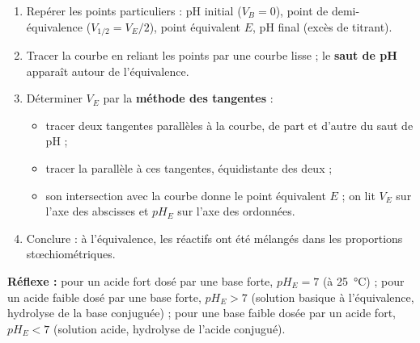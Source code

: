 \documentclass[11pt]{article}
\newcommand{\cle}[1]{{\popxbold\color{popdark}#1}}
\begin{document}
\begin{methode}[Tracer et exploiter la courbe pH = f(V)]
\begin{enumerate}
\item \cle{Repérer} les points particuliers : pH initial ($V_B = 0$), point de demi-équivalence ($V_{1/2} = V_E/2$), point équivalent $E$, pH final (excès de titrant).
\item \cle{Tracer} la courbe en reliant les points par une courbe lisse ; le \textbf{saut de pH} apparaît autour de l'équivalence.
\item \cle{Déterminer} $V_E$ par la \textbf{méthode des tangentes} :
\begin{itemize}
\item tracer deux tangentes parallèles à la courbe, de part et d'autre du saut de pH ;
\item tracer la parallèle à ces tangentes, équidistante des deux ;
\item son intersection avec la courbe donne le point équivalent $E$ ; on lit $V_E$ sur l'axe des abscisses et $pH_E$ sur l'axe des ordonnées.
\end{itemize}
\item \cle{Conclure} : à l'équivalence, les réactifs ont été mélangés dans les proportions stœchiométriques.
\end{enumerate}
\textbf{Réflexe :} pour un acide fort dosé par une base forte, $pH_E = 7$ (à \SI{25}{\celsius}) ; pour un acide faible dosé par une base forte, $pH_E > 7$ (solution basique à l'équivalence, hydrolyse de la base conjuguée) ; pour une base faible dosée par un acide fort, $pH_E < 7$ (solution acide, hydrolyse de l'acide conjugué).
\end{methode}
\end{document}
